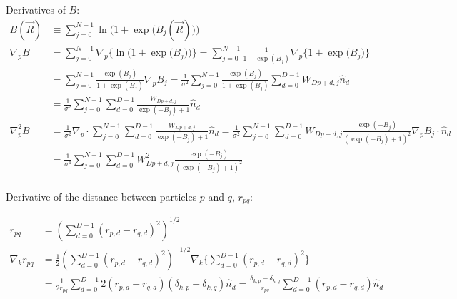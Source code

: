 \documentclass[12pt]{article}
\begin{document}
\noindent Derivatives of $B$:
\begin{align*}
B(\vec{R}) &\equiv \sum_{j=0}^{N-1} \ln \Big(  1 + \exp \big( B_j (\vec{R}) \big) \Big)\\
\nabla_p  B  &= \sum_{j=0}^{N-1}\nabla_p \bigg\{  \ln \Big(  1 + \exp \big( B_j \big) \Big) \bigg\} = \sum_{j=0}^{N-1} \frac{1}{1+\exp(B_j)} \nabla_p  \bigg\{  1 + \exp \big( B_j \big) \bigg\} \\
&=\sum_{j=0}^{N-1} \frac{\exp(B_j)}{1+\exp(B_j)} \nabla_p B_j =  \frac{1}{\sigma^2} \sum_{j=0}^{N-1} \frac{\exp(B_j)}{1+\exp(B_j)}\sum_{d=0}^{D-1} W_{Dp+d,j} \hat{n}_d\\
&= \frac{1}{\sigma^2} \sum_{j=0}^{N-1} \sum_{d=0}^{D-1} \frac{W_{Dp+d,j}}{\exp(-B_j)+1}  \hat{n}_d\\
\nabla_p^2 B &= \frac{1}{\sigma^2} \nabla_p \cdot \sum_{j=0}^{N-1} \sum_{d=0}^{D-1} \frac{W_{Dp+d,j}}{\exp(-B_j)+1}  \hat{n}_d = \frac{1}{\sigma^2} \sum_{j=0}^{N-1} \sum_{d=0}^{D-1} W_{Dp+d,j} \frac{\exp(-B_j)}{(\exp(-B_j)+1)^2} \nabla_p B_j \cdot \hat{n}_d \\
&= \frac{1}{\sigma^4}\sum_{j=0}^{N-1} \sum_{d=0}^{D-1} W_{Dp+d,j}^2 \frac{\exp(-B_j)}{(\exp(-B_j)+1)^2}\\
\end{align*}

\noindent Derivative of the distance between particles $p$ and $q$, $r_{pq}$:

\begin{align*}
r_{pq} &= \left( \sum_{d=0}^{D-1} (r_{p,d}-r_{q,d})^2 \right)^{1/2}\\
\nabla_k r_{pq} &= \frac{1}{2} \left( \sum_{d=0}^{D-1} (r_{p,d}-r_{q,d})^2 \right)^{-1/2} \nabla_k \bigg\{ \sum_{d=0}^{D-1} (r_{p,d}-r_{q,d})^2 \bigg\} \\
&= \frac{1}{2 r_{pq}} \sum_{d=0}^{D-1} 2(r_{p,d}-r_{q,d})(\delta_{k,p}-\delta_{k,q}) \hat{n}_{d} = \frac{\delta_{k,p}-\delta_{k,q}}{r_{pq}} \sum_{d=0}^{D-1} (r_{p,d}-r_{q,d}) \hat{n}_{d} \\ \\
\end{align*}
\end{document}
